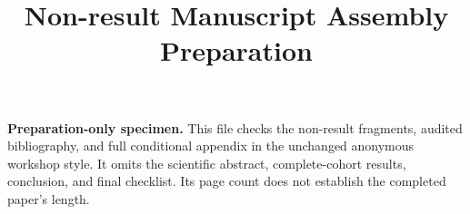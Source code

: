 
\title{Non-result Manuscript Assembly Preparation}

\maketitle
\noindent\textbf{Preparation-only specimen.}
This file checks the non-result fragments, audited bibliography, and full
conditional appendix in the unchanged anonymous workshop style. It omits
the scientific abstract, complete-cohort results, conclusion, and final
checklist. Its page count does not establish the completed paper's length.

\label{prep:main-end}
\clearpage


\clearpage
\appendix



